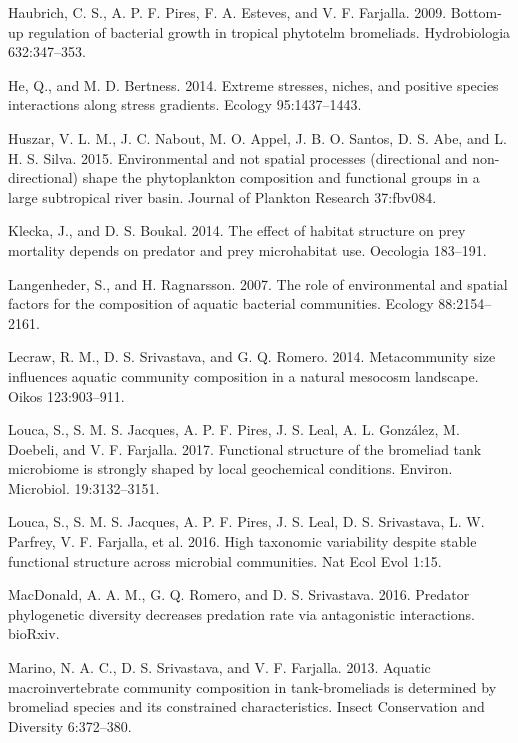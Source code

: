 \documentclass[12pt,]{article}
\begin{document}
\hypertarget{ref-Haubrich2009a}{}
Haubrich, C. S., A. P. F. Pires, F. A. Esteves, and V. F. Farjalla.
2009. Bottom-up regulation of bacterial growth in tropical phytotelm
bromeliads. Hydrobiologia 632:347--353.

\hypertarget{ref-He2014a}{}
He, Q., and M. D. Bertness. 2014. Extreme stresses, niches, and positive
species interactions along stress gradients. Ecology 95:1437--1443.

\hypertarget{ref-Huszar2015}{}
Huszar, V. L. M., J. C. Nabout, M. O. Appel, J. B. O. Santos, D. S. Abe,
and L. H. S. Silva. 2015. Environmental and not spatial processes
(directional and non-directional) shape the phytoplankton composition
and functional groups in a large subtropical river basin. Journal of
Plankton Research 37:fbv084.

\hypertarget{ref-Klecka2014}{}
Klecka, J., and D. S. Boukal. 2014. The effect of habitat structure on
prey mortality depends on predator and prey microhabitat use. Oecologia
183--191.

\hypertarget{ref-Langenheder2007}{}
Langenheder, S., and H. Ragnarsson. 2007. The role of environmental and
spatial factors for the composition of aquatic bacterial communities.
Ecology 88:2154--2161.

\hypertarget{ref-Lecraw2014}{}
Lecraw, R. M., D. S. Srivastava, and G. Q. Romero. 2014. Metacommunity
size influences aquatic community composition in a natural mesocosm
landscape. Oikos 123:903--911.

\hypertarget{ref-Louca2017-lw}{}
Louca, S., S. M. S. Jacques, A. P. F. Pires, J. S. Leal, A. L. González,
M. Doebeli, and V. F. Farjalla. 2017. Functional structure of the
bromeliad tank microbiome is strongly shaped by local geochemical
conditions. Environ. Microbiol. 19:3132--3151.

\hypertarget{ref-Louca2016-ki}{}
Louca, S., S. M. S. Jacques, A. P. F. Pires, J. S. Leal, D. S.
Srivastava, L. W. Parfrey, V. F. Farjalla, et al. 2016. High taxonomic
variability despite stable functional structure across microbial
communities. Nat Ecol Evol 1:15.

\hypertarget{ref-MacDonald089144}{}
MacDonald, A. A. M., G. Q. Romero, and D. S. Srivastava. 2016. Predator
phylogenetic diversity decreases predation rate via antagonistic
interactions. bioRxiv.

\hypertarget{ref-Marino2012}{}
Marino, N. A. C., D. S. Srivastava, and V. F. Farjalla. 2013. Aquatic
macroinvertebrate community composition in tank-bromeliads is determined
by bromeliad species and its constrained characteristics. Insect
Conservation and Diversity 6:372--380.
\end{document}
